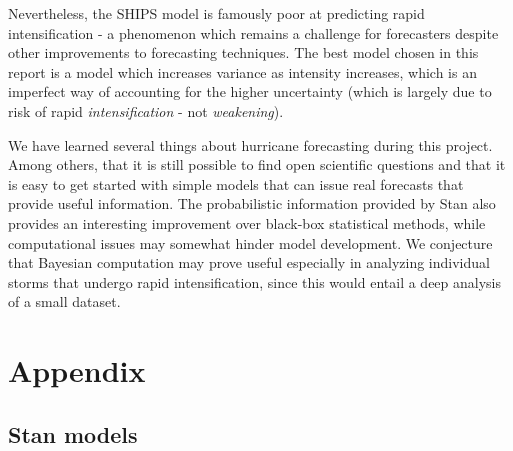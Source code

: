 \documentclass[
]{article}
\begin{document}
Nevertheless, the SHIPS model is famously poor at predicting rapid
intensification - a phenomenon which remains a challenge for forecasters
despite other improvements to forecasting techniques. The best model
chosen in this report is a model which increases variance as intensity
increases, which is an imperfect way of accounting for the higher
uncertainty (which is largely due to risk of rapid
\emph{intensification} - not \emph{weakening}).

We have learned several things about hurricane forecasting during this
project. Among others, that it is still possible to find open scientific
questions and that it is easy to get started with simple models that can
issue real forecasts that provide useful information. The probabilistic
information provided by Stan also provides an interesting improvement
over black-box statistical methods, while computational issues may
somewhat hinder model development. We conjecture that Bayesian
computation may prove useful especially in analyzing individual storms
that undergo rapid intensification, since this would entail a deep
analysis of a small dataset.

\newpage

\hypertarget{appendix}{%
\section{Appendix}\label{appendix}}

\hypertarget{stan-models}{%
\subsection{Stan models}\label{stan-models}}
\end{document}
